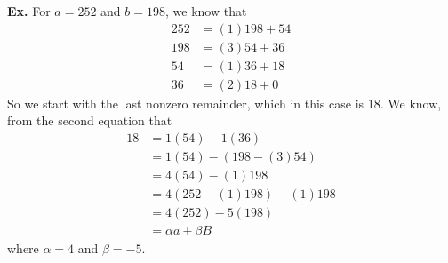 \documentclass[class=article, crop=false]{standalone}
\begin{document}
\textbf{Ex.} For $a=252$ and $b=198$, we know that
\begin{align*}
	252 &= (1)198 + 54\\
	198 &= (3)54 + 36\\
	54 &= (1)36 + 18\\
	36 &= (2)18 + 0
\end{align*}
So we start with the last nonzero remainder, which in this case is 18. We know, from the second equation that
\begin{align*}
	18 &= 1(54) - 1(36) \\
	&= 1(54) - (198-(3)54) \\
	&= 4(54) - (1)198 \\
	&= 4(252-(1)198)- (1)198 \\
	&= 4(252) - 5(198) \\
	&= \alpha a + \beta B
\end{align*}
where $\alpha = 4$ and $\beta = -5$.
\end{document}
